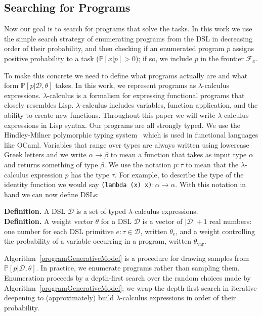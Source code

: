 \documentclass{article}
\newcommand{\probability}{\mathds{P}} %
\begin{document}

\subsection{Searching for Programs}\label{explorationSection}

Now our goal is to search for programs that solve the tasks.  In this
work we use the simple search strategy of enumerating programs from
the DSL  in decreasing order of their probability,
and then checking if an enumerated program $p$ assigns positive
probability to a task ($\probability[x|p] > 0$); if so, we include $p$ in
the frontier $\mathcal{F}_x$.

To make this concrete we need to define what programs actually are and
what form $\probability[p |\mathcal{D},\theta]$ takes.
In this work, we represent programs as $\lambda$-calculus expressions.
$\lambda$-calculus is a formalism for expressing functional programs
that closely resembles Lisp.
$\lambda$-calculus includes variables, function application, and the ability to create new functions.
Throughout this paper we will write $\lambda$-calculus expressions in Lisp syntax.
Our programs are all strongly typed.
We use the Hindley-Milner polymorphic typing system~\cite{pierce} which is used in functional languages like OCaml.
Variables that range over types are always written using lowercase Greek letters
and we write $\alpha\to \beta$ to mean a function that takes as input type $\alpha$
and returns something of type $\beta$.
We use the notation $p:\tau$ to mean that the $\lambda$-calculus expression $p$
has the type $\tau$.
For example, to describe the type of the identity function
we would say \texttt{(lambda (x) x)}$:\alpha\to \alpha$.
With this notation in hand we can now define DSLs:

\noindent\textbf{Definition.}
A DSL $\mathcal{D}$ is a set of typed $\lambda$-calculus expressions.
\\\noindent\textbf{Definition.}
A weight vector $\theta$ for a DSL $\mathcal{D}$ is a vector of $|\mathcal{D}| + 1$ real numbers:
one number for each DSL primitive $e:\tau\in \mathcal{D}$, written $\theta_e$,
and a weight controlling the probability of a variable occurring in a program, written $\theta_{\text{var}}$.

Algorithm~\ref{programGenerativeModel} is a procedure for drawing
samples from $\probability[p|\mathcal{D},\theta]$.  In practice, we
enumerate programs rather than sampling them.  Enumeration proceeds by
a depth-first search over the random choices made by
Algorithm~\ref{programGenerativeModel}; we wrap the depth-first search
in iterative deepening to (approximately) build $\lambda$-calculus
expressions in order of their probability.
\end{document}
